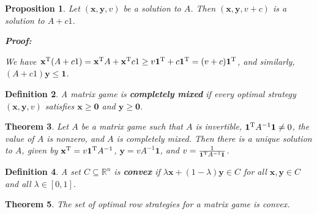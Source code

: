 \documentclass{article}
\theoremstyle{colontheorem}
\newtheorem{theorem}{Theorem}[section]
\newtheorem{proposition}[theorem]{Proposition}
\newtheorem{definition}[theorem]{Definition}
\newcommand{\T}{^\textnormal{T}}
\newenvironment{Theorem}
{
	\begin{mdframed}[backgroundcolor=TheoremOrange!10]
	\begin{theorem}
}
{
	\end{theorem}
	\end{mdframed}
	
	\vspace{.15in}
}
\newenvironment{Proposition}
{
	\begin{mdframed}[backgroundcolor=TheoremOrange!10]
	\begin{proposition}
}
{
	\end{proposition}
	\end{mdframed}
	
	\vspace{.15in}
}
\newenvironment{Def}
{
	\begin{mdframed}[backgroundcolor=DefGreen!10]
	\begin{definition}
}
{
	\end{definition}
	\end{mdframed}
	
	\vspace{.15in}
}
\newenvironment{Proof}
{
	\begin{mdframed}[backgroundcolor=ProofPurple!10]
	\textbf{Proof:}%
}
{
	\end{mdframed}
	
	\vspace{.085in}
}
\begin{document}
\begin{Proposition}
	
	Let $(\mathbf{x}, \mathbf{y}, v)$ be a solution to $A$. Then $(\mathbf{x}, \mathbf{y}, v + c)$ is a solution to $A + c1$.
	
	\begin{Proof}
		We have $\mathbf{x}\T (A + c1) = \mathbf{x}\T A + \mathbf{x}\T c 1 \geq v \mathbf{1}\T + c \mathbf{1}\T = (v + c) \mathbf{1}\T$, and similarly, $(A + c1) \mathbf{y} \leq \mathbf{1}$.
		
	\end{Proof}
	
\end{Proposition}



\begin{Def}
	
	A matrix game is \textbf{completely mixed} if every optimal strategy $(\mathbf{x}, \mathbf{y}, v)$ satisfies $\mathbf{x} \geq \mathbf{0}$ and $\mathbf{y} \geq \mathbf{0}$.
	
\end{Def}



\begin{Theorem}
	
	Let $A$ be a matrix game such that $A$ is invertible, $\mathbf{1}\T A^{-1} \mathbf{1} \neq 0$, the value of $A$ is nonzero, and $A$ is completely mixed. Then there is a unique solution to $A$, given by $\mathbf{x}\T = v \mathbf{1}\T A^{-1}$, $\mathbf{y} = v A^{-1} \mathbf{1}$, and $v = \frac{1}{\mathbf{1}\T A^{-1} \mathbf{1}}$.
	
\end{Theorem}



\begin{Def}
	
	A set $C \subseteq \mathbb{R}^n$ is \textbf{convex} if $\lambda \mathbf{x} + (1 - \lambda) \mathbf{y} \in C$ for all $\mathbf{x}, \mathbf{y} \in C$ and all $\lambda \in [0, 1]$.
	
\end{Def}



\begin{Theorem}
	
	The set of optimal row strategies for a matrix game is convex.
	
\end{Theorem}
\end{document}
